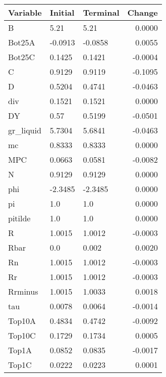 \begin{table}
\centering
\label{tab:stst_comparison_fast_shock_wedge_permanent}
\begin{tabular}{lllr}
\toprule
                Variable & Initial & Terminal &  Change \\
\midrule
                       B &    5.21 &     5.21 &  0.0000 \\
                  Bot25A & -0.0913 &  -0.0858 &  0.0055 \\
                  Bot25C &  0.1425 &   0.1421 & -0.0004 \\
                       C &  0.9129 &   0.9119 & -0.1095 \\
                       D &  0.5204 &   0.4741 & -0.0463 \\
                     div &  0.1521 &   0.1521 &  0.0000 \\
                      DY &    0.57 &   0.5199 & -0.0501 \\
               gr\_liquid &  5.7304 &   5.6841 & -0.0463 \\
                      mc &  0.8333 &   0.8333 &  0.0000 \\
                     MPC &  0.0663 &   0.0581 & -0.0082 \\
                       N &  0.9129 &   0.9129 &  0.0000 \\
                     phi & -2.3485 &  -2.3485 &  0.0000 \\
                      pi &     1.0 &      1.0 &  0.0000 \\
                 pitilde &     1.0 &      1.0 &  0.0000 \\
                       R &  1.0015 &   1.0012 & -0.0003 \\
                    Rbar &     0.0 &    0.002 &  0.0020 \\
                      Rn &  1.0015 &   1.0012 & -0.0003 \\
                      Rr &  1.0015 &   1.0012 & -0.0003 \\
                 Rrminus &  1.0015 &   1.0033 &  0.0018 \\
                     tau &  0.0078 &   0.0064 & -0.0014 \\
                  Top10A &  0.4834 &   0.4742 & -0.0092 \\
                  Top10C &  0.1729 &   0.1734 &  0.0005 \\
                   Top1A &  0.0852 &   0.0835 & -0.0017 \\
                   Top1C &  0.0222 &   0.0223 &  0.0001 \\

\end{tabular}
\end{table}
